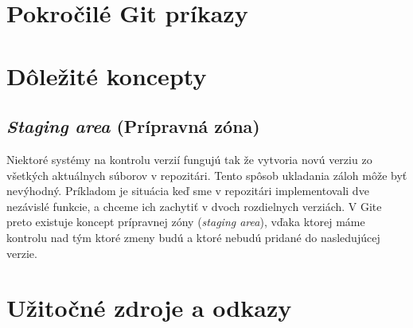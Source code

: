 \documentclass[a4paper,12pt,oneside]{article}
\begin{document}


\section{Pokročilé Git príkazy}

\section{Dôležité koncepty}

\subsection{\textit{Staging area} (Prípravná zóna)}
Niektoré systémy na kontrolu verzií fungujú tak že vytvoria novú verziu zo všetkých aktuálnych súborov v repozitári. Tento spôsob ukladania záloh môže byť nevýhodný. Príkladom je situácia keď sme v repozitári implementovali dve nezávislé funkcie, a chceme ich zachytiť v dvoch rozdielnych verziách. V Gite preto existuje koncept prípravnej zóny (\textit{staging area}), vďaka ktorej máme kontrolu nad tým ktoré zmeny budú a ktoré nebudú pridané do nasledujúcej verzie.

\section{Užitočné zdroje a odkazy}
\end{document}
